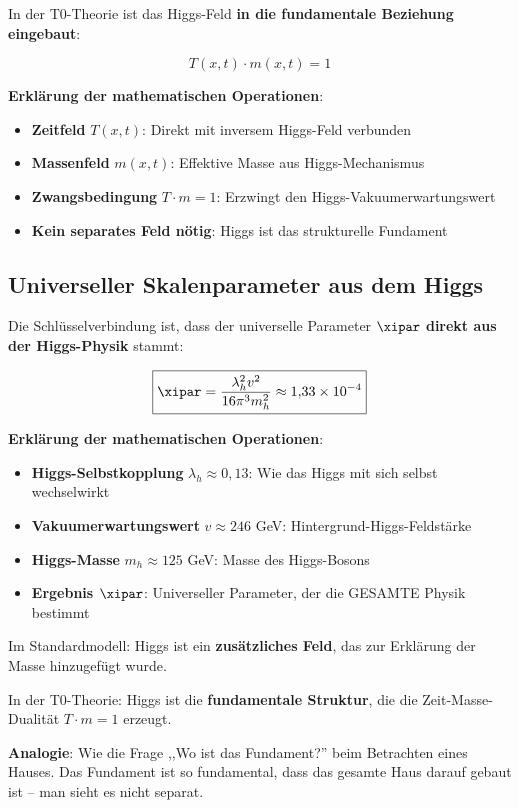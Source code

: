 	In der T0-Theorie ist das Higgs-Feld \textbf{in die fundamentale Beziehung eingebaut}:
	
	\begin{equation}
		\boxed{T(x,t) \cdot m(x,t) = 1}
		\label{eq:higgs_foundation}
	\end{equation}
	
	\textbf{Erklärung der mathematischen Operationen}:
	\begin{itemize}
		\item \textbf{Zeitfeld} $T(x,t)$: Direkt mit inversem Higgs-Feld verbunden
		\item \textbf{Massenfeld} $m(x,t)$: Effektive Masse aus Higgs-Mechanismus
		\item \textbf{Zwangsbedingung} $T \cdot m = 1$: Erzwingt den Higgs-Vakuumerwartungswert
		\item \textbf{Kein separates Feld nötig}: Higgs ist das strukturelle Fundament
	\end{itemize}
	
	\subsection{Universeller Skalenparameter aus dem Higgs}
	
	Die Schlüsselverbindung ist, dass der universelle Parameter $\xipar$ \textbf{direkt aus der Higgs-Physik} stammt:
	
	\begin{equation}
		\boxed{\xipar = \frac{\lambda_h^2 v^2}{16\pi^3 m_h^2} \approx 1{,}33 \times 10^{-4}}
		\label{eq:xi_from_higgs}
	\end{equation}
	
	\textbf{Erklärung der mathematischen Operationen}:
	\begin{itemize}
		\item \textbf{Higgs-Selbstkopplung} $\lambda_h \approx 0{,}13$: Wie das Higgs mit sich selbst wechselwirkt
		\item \textbf{Vakuumerwartungswert} $v \approx 246$ GeV: Hintergrund-Higgs-Feldstärke
		\item \textbf{Higgs-Masse} $m_h \approx 125$ GeV: Masse des Higgs-Bosons
		\item \textbf{Ergebnis $\xipar$}: Universeller Parameter, der die GESAMTE Physik bestimmt
	\end{itemize}
	
	\begin{tcolorbox}[colback=purple!5!white,colframe=purple!75!black,title=Higgs-Integration in der T0-Theorie]
		Im Standardmodell: Higgs ist ein \textbf{zusätzliches Feld}, das zur Erklärung der Masse hinzugefügt wurde.
		
		In der T0-Theorie: Higgs ist die \textbf{fundamentale Struktur}, die die Zeit-Masse-Dualität $T \cdot m = 1$ erzeugt.
		
		\textbf{Analogie}: Wie die Frage ,,Wo ist das Fundament?'' beim Betrachten eines Hauses. Das Fundament ist so fundamental, dass das gesamte Haus darauf gebaut ist -- man sieht es nicht separat.
	\end{tcolorbox}
	
